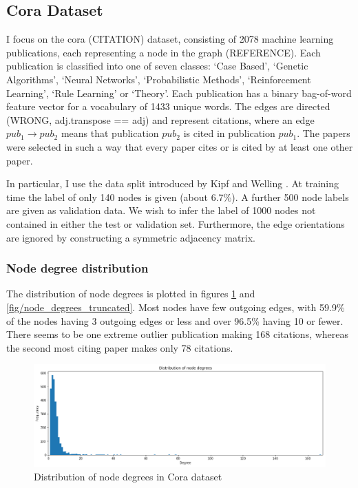 \documentclass[12pt]{article}
\theoremstyle{definition}
\begin{document}
\subsection{Cora Dataset}
I focus on the cora (CITATION) dataset, consisting of 2078 machine learning publications, each representing a node in the graph (REFERENCE). Each publication is classified into one of seven classes: `Case Based', `Genetic Algorithms', `Neural Networks', `Probabilistic Methods', `Reinforcement Learning', `Rule Learning' or `Theory'. Each publication has a binary bag-of-word feature vector for a vocabulary of 1433 unique words. The edges are directed (WRONG, adj.transpose == adj) and represent citations, where an edge $\mathit{pub_1} \to \mathit{pub_2}$ means that publication $\mathit{pub_2}$ is cited in publication $\mathit{pub_1}$. The papers were selected in such a way that every paper cites or is cited by at least one other paper.

In particular, I use the data split introduced by Kipf and Welling \cite{kipf2017semi}. At training time the label of only 140 nodes is given (about 6.7\%). A further 500 node labels are given as validation data. We wish to infer the label of 1000 nodes not contained in either the test or validation set. Furthermore, the edge orientations are ignored by constructing a symmetric adjacency matrix.

\subsubsection{Node degree distribution}
The distribution of node degrees is plotted in figures \ref{fig/node_degrees} and \ref{fig/node_degrees_truncated}. Most nodes have few outgoing edges, with 59.9\% of the nodes having 3 outgoing edges or less and over 96.5\% having 10 or fewer. There seems to be one extreme outlier publication making 168 citations, whereas the second most citing paper makes only 78 citations.

\begin{figure}[h]
	\includegraphics[width=1.0\textwidth]{node_degrees}
	\centering
	\caption{Distribution of node degrees in Cora dataset}
	\label{fig/node_degrees}
\end{figure}
\end{document}
